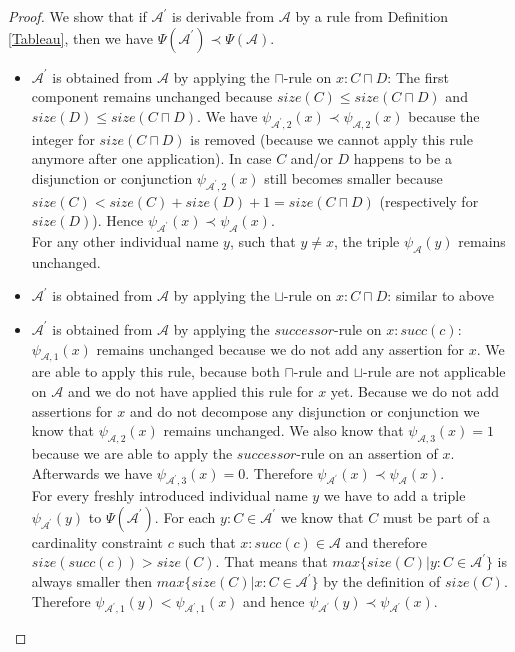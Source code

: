 \documentclass{book}
\theoremstyle{break}
\theoremstyle{definition}
\begin{document}
\begin{proof}
We show that if $\mathcal{A}^\prime$ is derivable from $\mathcal{A}$ by a rule from Definition \ref{Tableau}, then we have $\Psi(\mathcal{A}^\prime)\prec \Psi(\mathcal{A})$.\\
\begin{itemize}
\item $\mathcal{A}^\prime$ is obtained from $\mathcal{A}$ by applying the $\sqcap$-rule on $x:C\sqcap D$: The first component remains unchanged because $size(C)\leq size(C\sqcap D)$ and $size(D)\leq size(C\sqcap D)$. We have $\psi_{\mathcal{A}^\prime,2}(x)\prec\psi_{\mathcal{A},2}(x)$ because the integer for $size(C\sqcap D)$ is removed (because we cannot apply this rule anymore after one application). In case $C$ and/or $D$ happens to be a disjunction or conjunction $\psi_{\mathcal{A}^\prime,2}(x)$ still becomes smaller because $size(C)< size(C)+size(D)+1=size(C\sqcap D)$ (respectively for $size(D)$). Hence $\psi_{\mathcal{A}^\prime}(x)\prec\psi_{\mathcal{A}}(x)$.\\
For any other individual name $y$, such that $y\neq x$, the triple $\psi_\mathcal{A}(y)$ remains unchanged.
\item $\mathcal{A}^\prime$ is obtained from $\mathcal{A}$ by applying the $\sqcup$-rule on $x:C\sqcap D$: similar to above
\item $\mathcal{A}^\prime$ is obtained from $\mathcal{A}$ by applying the $successor$-rule on $x:succ(c)$: $\psi_{\mathcal{A},1}(x)$ remains unchanged because we do not add any assertion for $x$. We are able to apply this rule, because both $\sqcap$-rule and $\sqcup$-rule are not applicable on $\mathcal{A}$ and we do not have applied this rule for $x$ yet. Because we do not add assertions for $x$ and do not decompose any disjunction or conjunction we know that $\psi_{\mathcal{A},2}(x)$ remains unchanged. We also know that $\psi_{\mathcal{A},3}(x)=1$ because we are able to apply the $successor$-rule on an assertion of $x$. Afterwards we have $\psi_{\mathcal{A}^\prime,3}(x)=0$. Therefore $\psi_{\mathcal{A}^\prime}(x)\prec\psi_\mathcal{A}(x)$.\\
For every freshly introduced individual name $y$ we have to add a triple $\psi_{\mathcal{A}^\prime}(y)$ to $\Psi(\mathcal{A}^\prime)$. For each $y:C\in\mathcal{A}^\prime$ we know that $C$ must be part of a cardinality constraint $c$ such that $x:succ(c)\in\mathcal{A}$ and therefore $size(succ(c))>size(C)$. That means that $max\{size(C)|y:C\in\mathcal{A}^\prime\}$ is always smaller then $max\{size(C)|x:C\in\mathcal{A}^\prime\}$ by the definition of $size(C)$. Therefore $\psi_{\mathcal{A}^\prime,1}(y)<\psi_{\mathcal{A}^\prime,1}(x)$ and hence $\psi_{\mathcal{A}^\prime}(y)\prec\psi_{\mathcal{A}^\prime}(x)$.\\

\end{itemize}
\end{proof}
\end{document}
